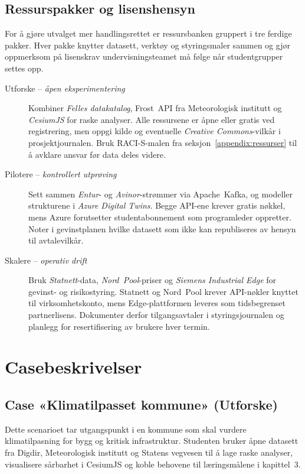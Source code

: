 \subsection{Ressurspakker og lisenshensyn}
For å gjøre utvalget mer handlingsrettet er ressursbanken gruppert i tre ferdige pakker. Hver pakke knytter datasett, verktøy og styringsmaler sammen og gjør oppmerksom på lisenskrav undervisningsteamet må følge når studentgrupper settes opp.

\begin{description}
    \item[Utforske – \emph{åpen eksperimentering}] Kombiner \emph{Felles datakatalog}, Frost~API fra Meteorologisk institutt og \emph{CesiumJS} for raske analyser. Alle ressursene er åpne eller gratis ved registrering, men oppgi kilde og eventuelle \emph{Creative Commons}-vilkår i prosjektjournalen. Bruk RACI-S-malen fra seksjon~\ref{appendix:ressurser} til å avklare ansvar før data deles videre.
    \item[Pilotere – \emph{kontrollert utprøving}] Sett sammen \emph{Entur}- og \emph{Avinor}-strømmer via Apache~Kafka, og modeller strukturene i \emph{Azure Digital Twins}. Begge API-ene krever gratis nøkkel, mens Azure forutsetter studentabonnement som programleder oppretter. Noter i gevinstplanen hvilke datasett som ikke kan republiseres av hensyn til avtalevilkår.
    \item[Skalere – \emph{operativ drift}] Bruk \emph{Statnett}-data, \emph{Nord~Pool}-priser og \emph{Siemens Industrial Edge} for gevinst- og risikostyring. Statnett og Nord~Pool krever API-nøkler knyttet til virksomhetskonto, mens Edge-plattformen leveres som tidsbegrenset partnerlisens. Dokumenter derfor tilgangsavtaler i styringsjournalen og planlegg for resertifisering av brukere hver termin.
\end{description}

\section{Casebeskrivelser}
\subsection{Case «Klimatilpasset kommune» (Utforske)}
Dette scenarioet tar utgangspunkt i en kommune som skal vurdere klimatilpasning for bygg og kritisk infrastruktur. Studenten bruker åpne datasett fra Digdir, Meteorologisk institutt og Statens vegvesen til å lage raske analyser, visualisere sårbarhet i CesiumJS og koble behovene til læringsmålene i kapittel~3.

